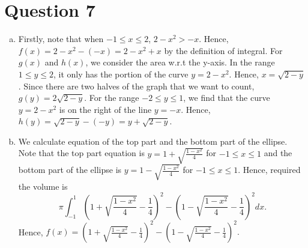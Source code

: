 \documentclass[12pt,a4paper]{article}
\begin{document}
	\section*{Question 7}
	\begin{enumerate}[a.]
	    \item Firstly, note that when $-1 \leq x \leq 2$, $2-x^2 > -x$. Hence, $f(x) = 2-x^2-(-x) = 2-x^2+x$ by the definition of integral. For $g(x)$ and $h(x)$, we consider the area w.r.t the y-axis. In the range $1 \leq y \leq 2$, it only has the portion of the curve $y = 2-x^2$. Hence, $x = \sqrt{2-y}$. Since there are two halves of the graph that we want to count, $g(y) = 2\sqrt{2-y}$. For the range $-2 \leq y \leq 1$, we find that the curve $y=2-x^2$ is on the right of the line $y=-x$. Hence, $h(y) = \sqrt{2-y}-(-y) = y+\sqrt{2-y}$.
	    
	    \item We calculate equation of  the top part and the bottom part of the ellipse. Note that the top part equation is $y = 1+\sqrt{\frac{1-x^2}{4}}$ for $-1 \leq x \leq 1$ and the bottom part of the ellipse is $y = 1-\sqrt{\frac{1-x^2}{4}}$ for $-1 \leq x \leq 1$. Hence, required the volume is $$\pi \int_{-1} ^1 \left(1+\sqrt{\frac{1-x^2}{4}} - \frac{1}{4}\right)^2 - \left(1-\sqrt{\frac{1-x^2}{4}}-\frac{1}{4}\right)^2 dx.$$
	    Hence, $f(x) =  \left(1+\sqrt{\frac{1-x^2}{4}} - \frac{1}{4}\right)^2 - \left(1-\sqrt{\frac{1-x^2}{4}}-\frac{1}{4}\right)^2.$
	\end{enumerate}
	
\end{document}
